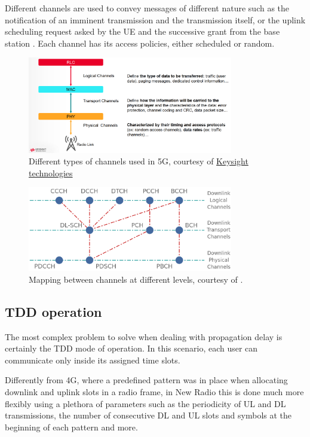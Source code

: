 Different channels are used to convey messages of different nature such as the notification of an imminent transmission and the transmission itself, or the uplink scheduling request asked by the \ac{UE} and the successive grant from the base station \cite{5g-mac-devopedia}. Each channel has its access policies, either scheduled or random.

\begin{figure}[ht]
    \centering
    \includegraphics[width=0.8\textwidth]{res/nr-types-channels.png}
    \caption{Different types of channels used in 5G, courtesy of \href{https://www.keysight.com/}{Keysight technologies}}
    \label{fig:nr-types-channels}
\end{figure}

\begin{figure}[ht]
    \centering
    \includegraphics[width=0.8\textwidth]{res/channels.png}
    \caption{Mapping between channels at different levels, courtesy of \cite{5g-ch-devopedia}.}
    \label{fig:nr-channel-mapping}
\end{figure}

\subsection{TDD operation}
The most complex problem to solve when dealing with propagation delay is certainly the \ac{TDD} mode of operation. In this scenario, each user can communicate only inside its assigned time slots.

Differently from 4G, where a predefined pattern was in place when allocating downlink and uplink slots in a radio frame, in New Radio this is done much more flexibly using a plethora of parameters such as the periodicity of UL and DL transmissions, the number of consecutive DL and UL slots and symbols at the beginning of each pattern and more.


